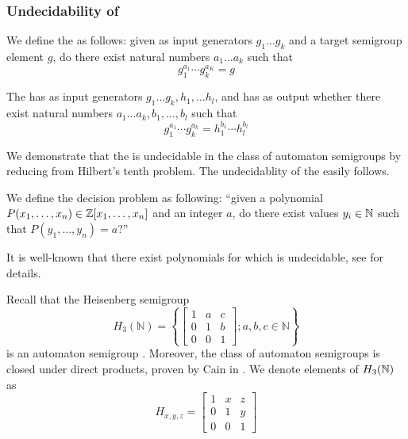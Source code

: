 \documentclass[11pt, titlepage]{article}
\begin{document}
\subsubsection{Undecidability of }

\begin{definition}
  We define the  as follows: given as input
  generators $g_1 \ldots g_k$ and a target semigroup element $g$, do
  there exist natural numbers $a_1\ldots a_k$ such that
  \[ g_1^{a_1} \cdots g_k^{a_K} = g \]
\end{definition}

\begin{definition}
  The  has as input generators
  $g_1 \ldots g_k, h_1, \ldots h_l$, and has as output whether there
  exist natural numbers $a_1\ldots a_k, b_1, \ldots, b_l$ such that
  \[ g_1^{a_1} \cdots g_k^{a_k} = h_1^{b_1} \cdots h_l^{b_l} \]
\end{definition}

We demonstrate that the  is
undecidable in the class of automaton semigroups by reducing from
Hilbert's tenth problem. The undecidablity of the  easily follows.

\begin{definition}
  We define the decision problem  as following:
  ``given a polynomial $P(x_1, \ldots, x_n) \in \mathbb{Z}[x_1, \ldots, x_n]$
  and an integer $a$, do there exist values $y_i \in \mathbb{N}$ such that
  $P(y_1, \ldots, y_n) = a$?''
\end{definition}

It is well-known that there exist polynomials for which
 is undecidable, see \cite{Matiyasevich:hilbert} for
details.

Recall that the Heisenberg semigroup
\[
  H_3(\mathbb{N}) = \left\{
      \begin{bmatrix}
        1 & a & c \\
        0 & 1 & b \\
        0 & 0 & 1
      \end{bmatrix}; a, b, c \in \mathbb{N}
    \right\}
\]
is an automaton semigroup \cite{Bondarenko:heisenberg}. Moreover, the
class of automaton semigroups is closed under direct products, proven
by Cain in \cite{Cain09:auto_sg}. We denote elements of $H_3(\mathbb{N})$ as
\[
  H_{x,y,z} = 
      \begin{bmatrix}
        1 & x & z \\
        0 & 1 & y \\
        0 & 0 & 1
      \end{bmatrix}
\]
\end{document}
